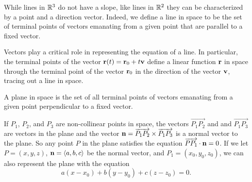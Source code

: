 


%

\begin{summary}
\item While lines in $\mathbb{R}^3$ do not have a slope, like lines in $\mathbb{R}^2$ they can be characterized by a point and a direction vector.  Indeed, we define a line in space to be the set of terminal points of vectors emanating from a given point that are parallel to a fixed vector.
\item Vectors play a critical role in representing the equation of a line.  In particular, the terminal points of the vector $\mathbf{r}(t) = \mathbf{r}_0 + t\mathbf{v}$ define a linear function $\mathbf{r}$ in space through the terminal point of the vector $\mathbf{r}_0$ in the direction of the vector $\mathbf{v}$, tracing out a line in space.
\item A plane in space is the set of all terminal points of vectors emanating from a given point perpendicular to a fixed vector.
\item If $P_1$, $P_2$, and $P_3$ are non-collinear points in space, the vectors $\overrightarrow{P_1P_2}$ and and $\overrightarrow{P_1P_3}$  are vectors in the plane and the vector $\mathbf{n} = \overrightarrow{P_1P_2} \times \overrightarrow{P_1P_3}$ is a normal vector to the plane. So any point $P$ in the plane satisfies the equation $\overrightarrow{PP_1} \cdot \mathbf{n} = 0$.  If we let $P = (x,y,z)$, $\mathbf{n} = \langle a,b,c \rangle$ be the normal vector, and $P_1 = (x_0,y_0,z_0)$, we can also represent the plane with the equation
$$a(x-x_0) + b(y-y_0) + c(z-z_0) = 0.$$
\end{summary}

\nin \hrulefill



\clearpage
